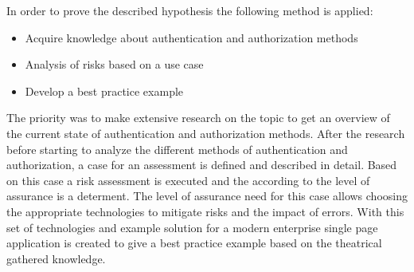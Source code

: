 In order to prove the described hypothesis the following method is applied:
  
\begin{itemize}
  	\item Acquire knowledge about authentication and authorization methods
  	\item Analysis of risks based on a use case
  	\item Develop a best practice example
\end{itemize}

The priority was to make extensive research on the topic to get an overview of the current state of authentication and authorization methods. After the research before starting to analyze the different methods of authentication and authorization, a case for an assessment is defined and described in detail. Based on this case a risk assessment is executed and the according to the level of assurance is a determent. The level of assurance need for this case allows choosing the appropriate technologies to mitigate risks and the impact of errors. With this set of technologies and example solution for a modern enterprise single page application is created to give a best practice example based on the theatrical gathered knowledge.


\chapterend

